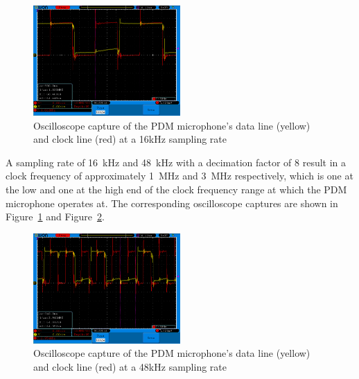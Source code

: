 \begin{figure}[H]
    \begin{center}
        \includegraphics[width=0.5\textwidth]{figures/16k_1mhz_sine.png}
    \end{center}
    \caption[Oscilloscope capture of the PDM microphone's data line (yellow) and clock line (red) at a 16kHz sampling rate]
    {Oscilloscope capture of the PDM microphone's data line (yellow) and clock line (red) at a 16kHz sampling rate}
    \label{fig:pdm_16k}
\end{figure}

A sampling rate of \SI{16}{\kilo\hertz} and \SI{48}{\kilo\hertz} with a decimation factor of 8
result in a clock frequency of approximately \SI{1}{\mega\hertz} and \SI{3}{\mega\hertz} respectively,
which is one at the low and one at the high end of the clock frequency range at which the PDM
microphone operates at.
The corresponding oscilloscope captures are shown in Figure~\ref{fig:pdm_16k} and Figure~\ref{fig:pdm_48k}.

\begin{figure}[H]
    \begin{center}
        \includegraphics[width=0.5\textwidth]{figures/48k_3mhz_sine.png}
    \end{center}
    \caption[Oscilloscope capture of the PDM microphone's data line (yellow) and clock line (red) at a 48kHz sampling rate]{Oscilloscope capture of the PDM microphone's data line (yellow) and clock line (red) at a 48kHz sampling rate}
    \label{fig:pdm_48k}
\end{figure}

